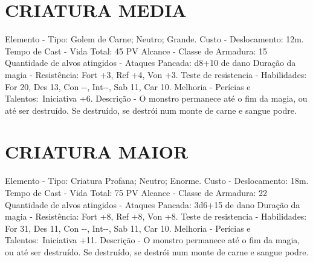 \documentclass{article}%
\begin{document}
%
\section{CRIATURA MEDIA}%
\label{sec:CRIATURAMEDIA}%
Elemento {-} Tipo: Golem de Carne; Neutro; Grande.\newline%
Custo {-} Deslocamento: 12m.\newline%
Tempo de Cast {-} Vida Total: 45 PV\newline%
Alcance {-} Classe de Armadura: 15\newline%
Quantidade de alvos atingidos {-} Ataques Pancada: d8+10 de dano\newline%
Duração da magia {-} Resistência: Fort +3, Ref +4, Von +3.\newline%
Teste de resistencia {-} Habilidades: For 20, Des 13, Con {-}{-}, Int{-}{-}, Sab 11, Car 10.\newline%
Melhoria {-} Perícias e Talentos:~Iniciativa +6.\newline%
Descrição {-} O monstro permanece até o fim da magia, ou até ser destruído. Se destruído, se destrói num monte de carne e sangue podre.\newline%

%
\section{CRIATURA MAIOR}%
\label{sec:CRIATURAMAIOR}%
Elemento {-} Tipo: Criatura Profana; Neutro; Enorme.\newline%
Custo {-} Deslocamento: 18m.\newline%
Tempo de Cast {-} Vida Total: 75 PV\newline%
Alcance {-} Classe de Armadura: 22\newline%
Quantidade de alvos atingidos {-} Ataques Pancada: 3d6+15 de dano\newline%
Duração da magia {-} Resistência: Fort +8, Ref +8, Von +8.\newline%
Teste de resistencia {-} Habilidades: For 31, Des 11, Con {-}{-}, Int{-}{-}, Sab 11, Car 10.\newline%
Melhoria {-} Perícias e Talentos:~Iniciativa +11.\newline%
Descrição {-} O monstro permanece até o fim da magia, ou até ser destruído. Se destruído, se destrói num monte de carne e sangue podre.\newline%

%
\end{document}
